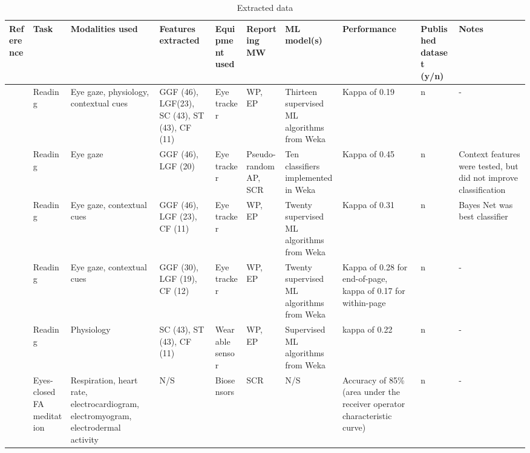 \begin{sidewaystable} %
\begin{table}[H]
\centering
\caption{Extracted data}
\label{tab:data}
\begin{threeparttable}
\begin{tabulary}{\textheight}{LLLLLLLLLL}
\toprule
Reference & Task & Modalities used & Features extracted & Equipment used & Reporting MW & ML model(s) & Performance & Published dataset (y/n) & Notes \\
		\midrule
\cite{Bixler2015AutomaticPhysiology}   &  Reading 	& Eye gaze, physiology, contextual cues & GGF (46), LGF(23), SC (43), ST (43), CF (11)  & Eye tracker   & WP, EP  &  Thirteen supervised ML algorithms from Weka        & Kappa of 0.19 & n & -\\
\cite{Bixler2015AutomaticAwareness}     &  Reading  & Eye gaze                              & GGF (46), LGF (20)                            & Eye tracker   & Pseudo-random AP, SCR  &  Ten classifiers implemented in Weka & Kappa of 0.45 & n & Context features were tested, but did not improve classification\\
\cite{Bixler2016AutomaticReading}       &  Reading 	& Eye gaze, contextual cues             & GGF (46), LGF (23), CF (11)                   & Eye tracker   & WP, EP & Twenty supervised ML algorithms from Weka            & Kappa of 0.31 & n & Bayes Net was best classifier\\
\cite{Bixler2014TowardWandering}        &  Reading  & Eye gaze, contextual cues             & GGF (30), LGF (19), CF (12)                   & Eye tracker   & WP, EP & Twenty supervised ML algorithms from Weka            & Kappa of 0.28 for end-of-page, kappa of 0.17 for within-page & n & -\\      
\cite{Blanchard2014AutomatedLearning}   &  Reading	& Physiology                                                                                            & SC (43), ST (43), CF (11)                                                          & Wearable sensor & WP, EP                                     & Supervised ML algorithms from Weka & kappa of 0.22 & n & -\\
\cite{Cheetham2016AutomatedApplication} &  Eyes-closed FA meditation  	& Respiration, heart rate, electrocardiogram, electromyogram, electrodermal activity & N/S                                                                               & Biosensors  &  SCR                                           & N/S & Accuracy of 85\% (area under the receiver operator characteristic curve) & n & -\\

\end{tabulary}
\end{threeparttable}
\end{table}
\end{sidewaystable}
